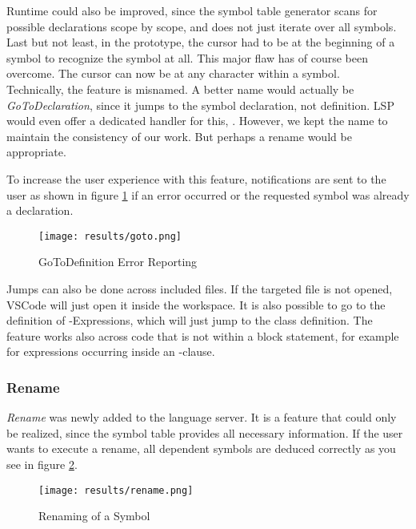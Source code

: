 Runtime could also be improved, since the symbol table generator scans for possible declarations scope by scope, and  does not just iterate over all symbols.
Last but not least, in the prototype, the cursor had to be at the beginning of a symbol to recognize the symbol at all.
This major flaw has of course been overcome.
The cursor can now be at any character within a symbol.\\

Technically, the feature is misnamed.
A better name would actually be \textit{GoToDeclaration}, since it jumps to the symbol declaration, not definition.
LSP would even offer a dedicated handler for this, \linebreak {} \cite{lspspec}.
However, we kept the name to maintain the consistency of our work.
But perhaps a rename would be appropriate.

To increase the user experience with this feature, notifications are sent to the user
as shown in figure \ref{fig:goto}
if an error occurred or the requested symbol was already a declaration.
\begin{figure}[H]
    \centering
    \texttt{[image: results/goto.png]}
    \caption{GoToDefinition Error Reporting}
    \label{fig:goto}
\end{figure}

Jumps can also be done across included files.
If the targeted file is not opened, VSCode will just open it inside the workspace.
It is also possible to go to the definition of -Expressions, which will just jump to the class definition.
The feature works also across code that is not within a block statement, for example for expressions occurring inside an -clause.

\subsubsection{Rename}
\textit{Rename} was newly added to the language server.
It is a feature that could only be realized, since the symbol table provides all necessary information.
If the user wants to execute a rename, all dependent symbols are deduced correctly as you see in figure \ref{fig:rename}.

\begin{figure}[H]
    \centering
    \texttt{[image: results/rename.png]}
    \caption{Renaming of a Symbol}
    \label{fig:rename}
\end{figure}

